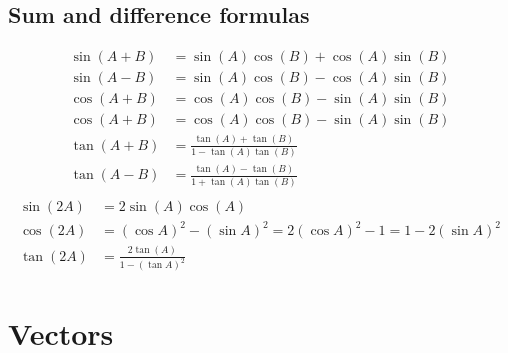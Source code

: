 \subsection{Sum and difference formulas}
\[\begin{aligned}
	\sin(A + B) &= \sin(A)\cos(B) + \cos(A)\sin(B) \\
	\sin(A - B) &= \sin(A)\cos(B) - \cos(A)\sin(B) \\
	\cos(A + B) &= \cos(A)\cos(B) - \sin(A)\sin(B) \\
	\cos(A + B) &= \cos(A)\cos(B) - \sin(A)\sin(B) \\
	\tan(A + B) &= \frac{\tan(A) + \tan(B)}{1-\tan(A)\tan(B)} \\
	\tan(A - B) &= \frac{\tan(A) - \tan(B)}{1+\tan(A)\tan(B)} \\
\end{aligned}\]\[\begin{aligned}
	\sin(2A) &= 2\sin(A)\cos(A) \\
	\cos(2A) &= (\cos A)^2 - (\sin A)^2 = 2(\cos A)^2 - 1 = 1 - 2(\sin A)^2 \\
	\tan(2A) &= \frac{2\tan(A)}{1 - (\tan A)^2}
\end{aligned}\]

\section{Vectors}
\newcommand{\dotp}{\boldsymbol{\cdot}}
\newcommand{\crossp}{\times}
\newcommand{\proj}{\text{proj}}

